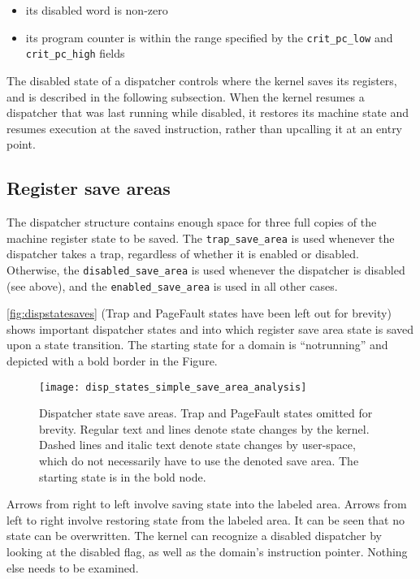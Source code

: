 \documentclass{scrreprt}
\begin{document}
  \begin{itemize}
  \item its disabled word is non-zero
  \item its program counter is within the range specified by the
    \lstinline+crit_pc_low+ and \lstinline+crit_pc_high+ fields
  \end{itemize}

  The disabled state of a dispatcher controls where the kernel saves
  its registers, and is described in the following subsection. When
  the kernel resumes a dispatcher that was last running while
  disabled, it restores its machine state and resumes execution at the
  saved instruction, rather than upcalling it at an entry point.

  \subsection{Register save areas}

  The dispatcher structure contains enough space for three full copies
  of the machine register state to be saved. The \lstinline+trap_save_area+
  is used whenever the dispatcher takes a trap, regardless of whether
  it is enabled or disabled. Otherwise, the \lstinline+disabled_save_area+
  is used whenever the dispatcher is disabled (see above), and the
  \lstinline+enabled_save_area+ is used in all other cases.

  \autoref{fig:dispstatesaves} (Trap and PageFault states have
  been left out for brevity) shows important dispatcher states and into
  which register save area state is saved upon a state transition. The
  starting state for a domain is ``notrunning'' and depicted with a
  bold border in the Figure.

  \begin{figure}
    \centering
   \texttt{[image: disp\_states\_simple\_save\_area\_analysis]}
   \caption[Dispatcher state save areas]{Dispatcher state save areas.
     Trap and PageFault states
     omitted for brevity. Regular text and lines denote state changes
     by the kernel. Dashed lines and italic text denote state changes
     by user-space, which do not necessarily have to use the denoted
     save area. The starting state is in the bold
     node.}\label{fig:dispstatesaves}
  \end{figure}

  Arrows from right to left involve saving state into the labeled
  area. Arrows from left to right involve restoring state from the
  labeled area. It can be seen that no state can be overwritten. The
  kernel can recognize a disabled dispatcher by looking at the
  disabled flag, as well as the domain's instruction pointer. Nothing
  else needs to be examined.
\end{document}
